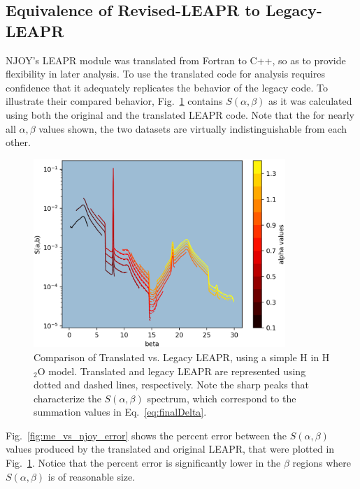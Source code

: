 \documentclass[Master.tex]{subfiles}
\begin{document}
  \subsection{Equivalence of Revised-LEAPR to Legacy-LEAPR}
    NJOY's LEAPR module was translated from Fortran to C++, so as to provide flexibility in later analysis. To use the translated code for analysis requires confidence that it adequately replicates the behavior of the legacy code. To illustrate their compared behavior, Fig.~\ref{fig:me_vs_njoy_sab} contains $S(\alpha,\beta)$ as it was calculated using both the original and the translated LEAPR code. Note that the for nearly all $\alpha,\beta$ values shown, the two datasets are virtually indistinguishable from each other. 
    \begin{figure}[h]
      \begin{center}
        \includegraphics[width=0.85\textwidth]{images/me-vs-njoy-1c}
        \caption[Comparison of Translated vs. Legacy LEAPR, for Test \#9 ($S(\alpha,\beta)$)]{Comparison of Translated vs. Legacy LEAPR, using a simple H in H$_2$O model. Translated and legacy LEAPR are represented using dotted and dashed lines, respectively. Note the sharp peaks that characterize the $S(\alpha,\beta)$ spectrum, which correspond to the summation values in Eq.~\ref{eq:finalDelta}.}
        \label{fig:me_vs_njoy_sab}
      \end{center}
    \end{figure}

    Fig.~\ref{fig:me_vs_njoy_error} shows the percent error between the $S(\alpha,\beta)$ values produced by the translated and original LEAPR, that were plotted in Fig.~\ref{fig:me_vs_njoy_sab}.  Notice that the percent error is significantly lower in the $\beta$ regions where $S(\alpha,\beta)$ is of reasonable size. 
\end{document}

